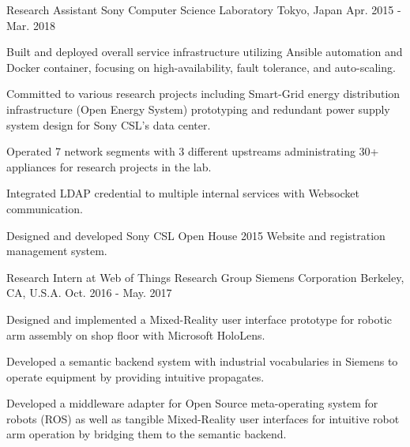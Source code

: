 \begin{cventries}
  \cventry
    {Research Assistant} %
    {Sony Computer Science Laboratory} %
    {Tokyo, Japan} %
    {Apr. 2015 - Mar. 2018} %
    {
      \begin{cvitems} %
        \item{Built and deployed overall service infrastructure utilizing Ansible automation and Docker container, focusing on high-availability, fault tolerance, and auto-scaling.}
        \item{Committed to various research projects including Smart-Grid energy distribution infrastructure (Open Energy System) prototyping and redundant power supply system design for Sony CSL's data center.}
        \item{Operated 7 network segments with 3 different upstreams administrating 30+ appliances for research projects in the lab.}
        \item{Integrated LDAP credential to multiple internal services with Websocket communication.}
        \item{Designed and developed Sony CSL Open House 2015 Website and registration management system.}
      \end{cvitems}
    }

  \cventry
    {Research Intern at Web of Things Research Group} %
    {Siemens Corporation} %
    {Berkeley, CA, U.S.A.} %
    {Oct. 2016 - May. 2017} %
    {
      \begin{cvitems} %
        \item{Designed and implemented a Mixed-Reality user interface prototype for robotic arm assembly on shop floor with Microsoft HoloLens.}
        \item{Developed a semantic backend system with industrial vocabularies in Siemens to operate equipment by providing intuitive propagates.}
        \item{Developed a middleware adapter for Open Source meta-operating system for robots (ROS) as well as tangible Mixed-Reality user interfaces for intuitive robot arm operation by bridging them to the semantic backend.}
      \end{cvitems}
    }


\end{cventries}
